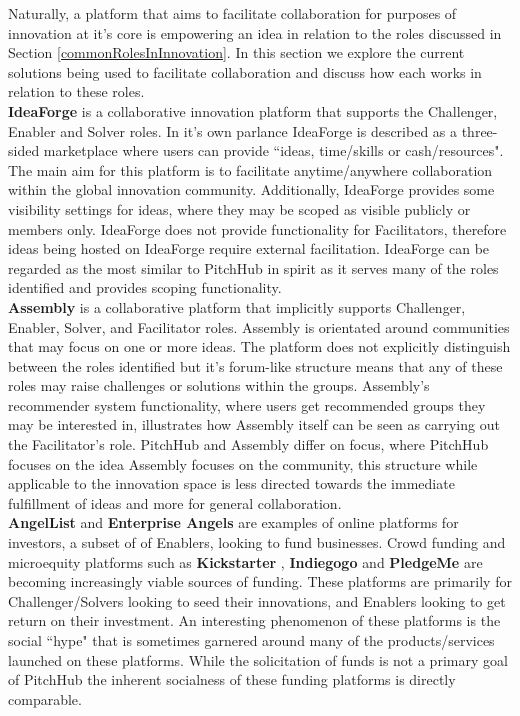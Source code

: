 Naturally, a platform that aims to facilitate collaboration for purposes of innovation at it's core is empowering an idea in relation to the roles discussed in Section \ref{commonRolesInInnovation}. In this section we explore the current solutions being used to facilitate collaboration and discuss how each works in relation to these roles.
\\
\newline
\textbf{IdeaForge} \cite{ideaForge:online}
is a collaborative innovation platform that supports the Challenger, Enabler and Solver roles. In it's own parlance IdeaForge is described as a three-sided marketplace where users can provide ``ideas, time/skills or cash/resources". The main aim for this platform is to facilitate anytime/anywhere collaboration within the global innovation community. Additionally, IdeaForge provides some visibility settings for ideas, where they may be scoped as visible publicly or members only. IdeaForge does not provide functionality for Facilitators, therefore ideas being hosted on IdeaForge require external facilitation. IdeaForge can be regarded as the most similar to PitchHub in spirit as it serves many of the roles identified and provides scoping functionality.
\\
\newline
\textbf{Assembly} \cite{assembly:online}
is a collaborative platform that implicitly supports Challenger, Enabler, Solver, and Facilitator roles. Assembly is orientated around communities that may focus on one or more ideas. The platform does not explicitly distinguish between the roles identified but it's forum-like structure means that any of these roles may raise challenges or solutions within the groups. Assembly's recommender system functionality, where users get recommended groups they may be interested in, illustrates how Assembly itself can be seen as carrying out the Facilitator's role. PitchHub and Assembly differ on focus, where PitchHub focuses on the idea Assembly focuses on the community, this structure while applicable to the innovation space is less directed towards the immediate fulfillment of ideas and more for general collaboration.
\\
\newline
\textbf{AngelList} \cite{Angel:online} and \textbf{Enterprise Angels} \cite{enterpriseAngles:online} are examples of online platforms for investors, a subset of of Enablers, looking to fund businesses. Crowd funding and microequity platforms such as \textbf{Kickstarter} \cite{Kicks6:online}, \textbf{Indiegogo} \cite{Indie3:online} and \textbf{PledgeMe} \cite{Pledge:online} are becoming increasingly viable sources of funding. These platforms are primarily for Challenger/Solvers looking to seed their innovations, and Enablers looking to get return on their investment. An interesting phenomenon of these platforms is the social ``hype" that is sometimes garnered around many of the products/services launched on these platforms. While the solicitation of funds is not a primary goal of PitchHub the inherent socialness of these funding platforms is directly comparable.
